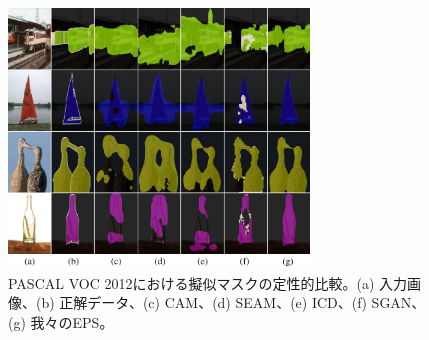 \begin{figure}[t]
\centering
\includegraphics[width=8cm]{figures/fig_ablation.pdf}
\caption{PASCAL VOC 2012における擬似マスクの定性的比較。(a) 入力画像、(b) 正解データ、(c) CAM、(d) SEAM、(e) ICD、(f) SGAN、(g) 我々のEPS。}
\label{fig:ablation} \vspace{-3mm}
\end{figure}
